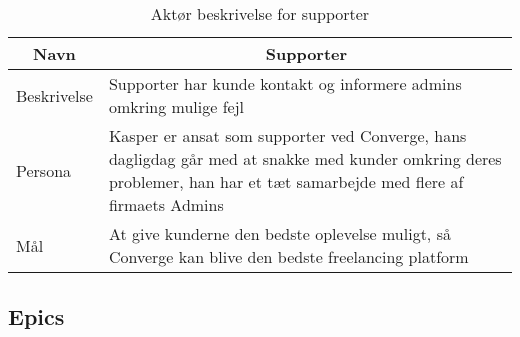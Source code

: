 \begin{table}[H]
    \begin{small}
        \caption{Aktør beskrivelse for supporter}
        \label{tab:supporter}
        \begin{center}
            \begin{tabular}[c]{l|l}
                \multicolumn{1}{c|}{\textbf{Navn}} & \multicolumn{1}{c}{\textbf{Supporter}}                                                                                                                                                            \\
                \hline
                Beskrivelse                        & \multicolumn{1}{p{10cm}}{Supporter har kunde kontakt og informere admins omkring mulige fejl}                                                                                                     \\
                \hline
                Persona                            & \multicolumn{1}{p{10cm}}{Kasper er ansat som supporter ved Converge, hans dagligdag går med at snakke med kunder omkring deres problemer, han har et tæt samarbejde med flere af firmaets Admins} \\
                \hline
                Mål                                & \multicolumn{1}{p{10cm}}{At give kunderne den bedste oplevelse muligt, så Converge kan blive den bedste freelancing platform}                                                                     \\
            \end{tabular}
        \end{center}
    \end{small}
\end{table}

\subsection{Epics}

